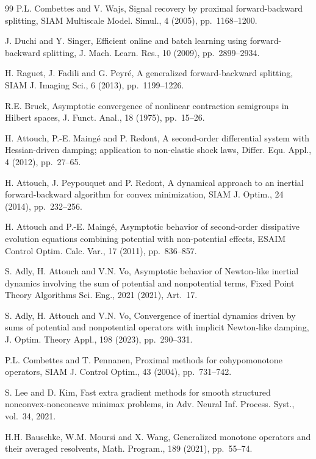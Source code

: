 \documentclass{article}
\theoremstyle{definition}
\theoremstyle{definition}
\theoremstyle{definition}
\begin{document}
\begin{thebibliography}{99}
 P.L. Combettes and V. Wajs, Signal recovery by proximal forward-backward splitting, SIAM Multiscale Model. Simul., 4 (2005), pp.~1168--1200.

 J. Duchi and Y. Singer, Efficient online and batch learning using forward-backward splitting, J. Mach. Learn. Res., 10 (2009), pp.~2899--2934.

 H. Raguet, J. Fadili and G. Peyr\'e, A generalized forward-backward splitting, SIAM J. Imaging Sci., 6 (2013), pp.~1199--1226.

 R.E. Bruck, Asymptotic convergence of nonlinear contraction semigroups in Hilbert spaces, J. Funct. Anal., 18 (1975), pp.~15--26.

 H. Attouch, P.-E. Maing\'e and P. Redont, A second-order differential system with Hessian-driven damping; application to non-elastic shock laws, Differ. Equ. Appl., 4 (2012), pp.~27--65.

 H. Attouch, J. Peypouquet and P. Redont, A dynamical approach to an inertial forward-backward algorithm for convex minimization, SIAM J. Optim., 24 (2014), pp.~232--256.

 H. Attouch and P.-E. Maing\'e, Asymptotic behavior of second-order dissipative evolution equations combining potential with non-potential effects, ESAIM Control Optim. Calc. Var., 17 (2011), pp.~836--857.

 S. Adly, H. Attouch and V.N. Vo, Asymptotic behavior of Newton-like inertial dynamics involving the sum of potential and nonpotential terms, Fixed Point Theory Algorithms Sci. Eng., 2021 (2021), Art.~17.

 S. Adly, H. Attouch and V.N. Vo, Convergence of inertial dynamics driven by sums of potential and nonpotential operators with implicit Newton-like damping, J. Optim. Theory Appl., 198 (2023), pp.~290--331.

 P.L. Combettes and T. Pennanen, Proximal methods for cohypomonotone operators, SIAM J. Control Optim., 43 (2004), pp.~731--742.

 S. Lee and D. Kim, Fast extra gradient methods for smooth structured nonconvex-nonconcave minimax problems, in Adv. Neural Inf. Process. Syst., vol.~34, 2021.

 H.H. Bauschke, W.M. Moursi and X. Wang, Generalized monotone operators and their averaged resolvents, Math. Program., 189 (2021), pp.~55--74.


\end{thebibliography}
\end{document}
